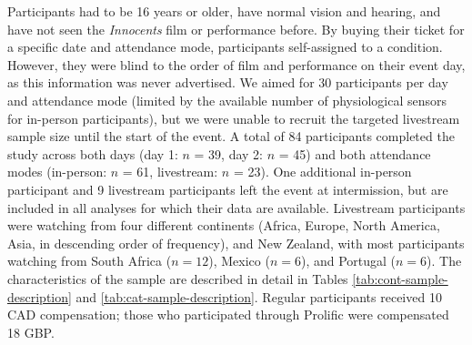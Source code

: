 \documentclass[
  man,floatsintext]{apa6}
\begin{document}
Participants had to be 16 years or older, have normal vision and hearing, and have not seen the \textit{Innocents} film or performance before. By buying their ticket for a specific date and attendance mode, participants self-assigned to a condition. However, they were blind to the order of film and performance on their event day, as this information was never advertised. We aimed for 30 participants per day and attendance mode (limited by the available number of physiological sensors for in-person participants), but we were unable to recruit the targeted livestream sample size until the start of the event. A total of 84 participants completed the study across both days (day 1: \(n\) = 39, day 2: \(n\) = 45) and both attendance modes (in-person: \(n\) = 61, livestream: \(n\) = 23). One additional in-person participant and 9 livestream participants left the event at intermission, but are included in all analyses for which their data are available. Livestream participants were watching from four different continents (Africa, Europe, North America, Asia, in descending order of frequency), and New Zealand, with most participants watching from South Africa (\(n = 12\)), Mexico (\(n = 6\)), and Portugal (\(n = 6\)). The characteristics of the sample are described in detail in Tables \ref{tab:cont-sample-description} and \ref{tab:cat-sample-description}. Regular participants received 10 CAD compensation; those who participated through Prolific were compensated 18 GBP.
\end{document}
